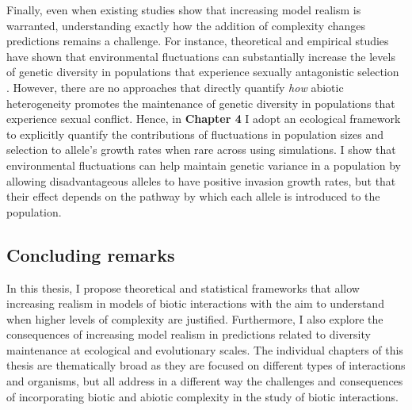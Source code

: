 \documentclass[12pt]{article}
\begin{document}
Finally, even when existing studies show that increasing model realism is warranted, understanding exactly how the addition of complexity changes predictions remains a challenge. For instance, theoretical and empirical studies have shown that environmental fluctuations can substantially increase the levels of genetic diversity in populations that experience sexually antagonistic selection \citep{connallon2012general,connallon_evolutionary_2019, glaser2021sexual}. However, there are no approaches that directly quantify \textit{how} abiotic heterogeneity promotes the maintenance of genetic diversity in populations that experience sexual conflict. Hence, in \textbf{Chapter 4} I adopt an ecological framework to explicitly quantify the contributions of fluctuations in population sizes and selection to allele's growth rates when rare across using simulations. I show that environmental fluctuations can help maintain genetic variance in a population by allowing disadvantageous alleles to have positive invasion growth rates,  but that their effect depends on the pathway by which each allele is introduced to the population.


\subsection*{Concluding remarks}


In this thesis, I propose theoretical and statistical frameworks that allow increasing realism in models of biotic interactions with the aim to understand when higher levels of complexity are justified. Furthermore, I also explore the consequences of increasing model realism in predictions related to diversity maintenance at ecological and evolutionary scales. The individual chapters of this thesis are thematically broad as they are focused on different types of interactions and organisms, but all address in a different way the challenges and consequences of incorporating biotic and abiotic complexity in the study of biotic interactions.
\end{document}
